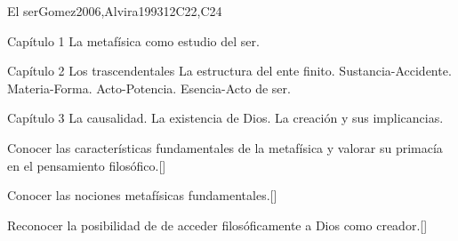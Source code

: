 \begin{syllabus}
\begin{unit}{}{El ser}{Gomez2006,Alvira1993}{12}{C22,C24}
\begin{topics}
	\item Capítulo 1
		\subitem La metafísica como estudio del ser.
	\item Capítulo 2
		\subitem Los trascendentales
		\subitem La estructura del ente finito. 
			\subsubitem Sustancia-Accidente.
			\subsubitem Materia-Forma.
			\subsubitem Acto-Potencia.
			\subsubitem Esencia-Acto de ser.
	\item Capítulo 3
		\subitem La causalidad.
		\subitem La existencia de Dios.
		\subitem La creación y sus implicancias.
\end{topics}

\begin{learningoutcomes}
	\item Conocer las características fundamentales de la metafísica y valorar su primacía en el pensamiento filosófico.[\Familiarity]
	\item Conocer las nociones metafísicas fundamentales.[\Familiarity]
	\item Reconocer la posibilidad de de acceder filosóficamente a Dios como creador.[\Familiarity]
\end{learningoutcomes}
\end{unit}

\begin{coursebibliography}
\end{coursebibliography}

\end{syllabus}
